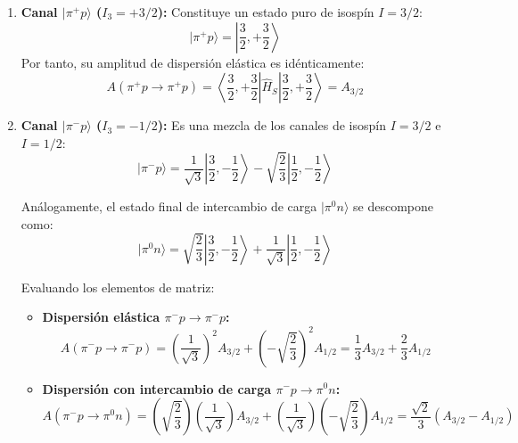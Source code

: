 \begin{enumerate}
    \item \textbf{Canal $|\pi^+ p\rangle$ ($I_3 = +3/2$):} Constituye un estado puro de isospín $I = 3/2$:
    \begin{equation}
        |\pi^+ p\rangle = \left| \frac{3}{2}, +\frac{3}{2} \right\rangle
    \end{equation}
    Por tanto, su amplitud de dispersión elástica es idénticamente:
    \begin{equation}
        A(\pi^+ p \to \pi^+ p) = \left\langle \frac{3}{2}, +\frac{3}{2} \right| \hat{H}_S \left| \frac{3}{2}, +\frac{3}{2} \right\rangle = A_{3/2}
    \end{equation}

    \item \textbf{Canal $|\pi^- p\rangle$ ($I_3 = -1/2$):} Es una mezcla de los canales de isospín $I = 3/2$ e $I = 1/2$:
    \begin{equation}
        |\pi^- p\rangle = \frac{1}{\sqrt{3}} \left| \frac{3}{2}, -\frac{1}{2} \right\rangle - \sqrt{\frac{2}{3}} \left| \frac{1}{2}, -\frac{1}{2} \right\rangle
    \end{equation}

    Análogamente, el estado final de intercambio de carga $|\pi^0 n\rangle$ se descompone como:
    \begin{equation}
        |\pi^0 n\rangle = \sqrt{\frac{2}{3}} \left| \frac{3}{2}, -\frac{1}{2} \right\rangle + \frac{1}{\sqrt{3}} \left| \frac{1}{2}, -\frac{1}{2} \right\rangle
    \end{equation}

    Evaluando los elementos de matriz:
    \begin{itemize}
        \item \textbf{Dispersión elástica $\pi^- p \to \pi^- p$:}
        \begin{equation}
            A(\pi^- p \to \pi^- p) = \left( \frac{1}{\sqrt{3}} \right)^2 A_{3/2} + \left( -\sqrt{\frac{2}{3}} \right)^2 A_{1/2} = \frac{1}{3} A_{3/2} + \frac{2}{3} A_{1/2}
        \end{equation}
        \item \textbf{Dispersión con intercambio de carga $\pi^- p \to \pi^0 n$:}
        \begin{equation}
            A(\pi^- p \to \pi^0 n) = \left( \sqrt{\frac{2}{3}} \right) \left( \frac{1}{\sqrt{3}} \right) A_{3/2} + \left( \frac{1}{\sqrt{3}} \right) \left( -\sqrt{\frac{2}{3}} \right) A_{1/2} = \frac{\sqrt{2}}{3} \left( A_{3/2} - A_{1/2} \right)
        \end{equation}
    \end{itemize}
\end{enumerate}

